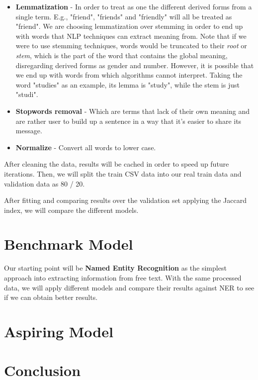 \documentclass[11pt]{article}
\begin{document}
\begin{itemize}
    \item \textbf{Lemmatization} - In order to treat as one the different derived forms from a single term. E.g., "friend", "friends" and "friendly" will all be treated as "friend". We are choosing lemmatization over stemming in order to end up with words that NLP techniques can extract meaning from. Note that if we were to use stemming techniques, words would be truncated to their \textit{root} or \textit{stem}, which is the part of the word that contains the global meaning, disregarding derived forms as gender and number. However, it is possible that we end up with words from which algorithms cannot interpret. Taking the word "studies" as an example, its lemma is "study", while the stem is just "studi".
    \item \textbf{Stopwords removal} - Which are terms that lack of their own meaning and are rather user to build up a sentence in a way that it's easier to share its message.
    \item \textbf{Normalize} - Convert all words to lower case.
\end{itemize}

After cleaning the data, results will be cached in order to speed up future iterations. Then, we will split the train CSV data into our real train data and validation data as 80 / 20.

After fitting and comparing results over the validation set applying the Jaccard index, we will compare the different models.

\section{Benchmark Model}

Our starting point will be \textbf{Named Entity Recognition} as the simplest approach into extracting information from free text.
With the same processed data, we will apply different models and compare their results against NER to see if we can obtain better results.

\section{Aspiring Model}

\section{Conclusion}
\end{document}
